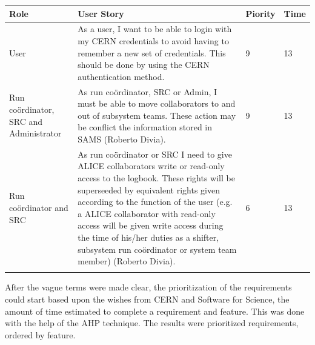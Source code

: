\documentclass[paper=a4, fontsize=11pt,twoside]{scrartcl}	%
\begin{document}
\begin{longtable}{ | p{3cm} | p{8cm} | p{1cm} | l |}
\hline
Role & User Story & Piority & Time \\ \hline
User & As a user, I want to be able to login with my CERN credentials to avoid having to remember a new set of credentials. This should be done by using the CERN authentication method. & 9 & 13 \\ \hline
Run coördinator, SRC and Administrator &  As run coördinator, SRC or Admin, I must be able to move collaborators to and out of subsystem teams. These action may be conflict the information stored in SAMS (Roberto Divia). & 9 & 13 \\ \hline
Run coördinator and SRC &  As run coördinator or SRC I need to give ALICE collaborators write or read-only access to the logbook. These rights will be superseeded by equivalent rights given according to the function of the user (e.g. a ALICE collaborator with read-only access will be given write access during the time of his/her duties as a shifter, subsystem run coördinator or system team member) (Roberto Divia).&6&13 \\ \hline

\label{table:hans}
\end{longtable}

After the vague terms were made clear, the prioritization of the requirements could start based upon the wishes from CERN and Software for Science, the amount of time estimated to complete a requirement and feature. This was done with the help of the AHP technique. The results were prioritized requirements, ordered by feature. 

\newpage
\end{document}
